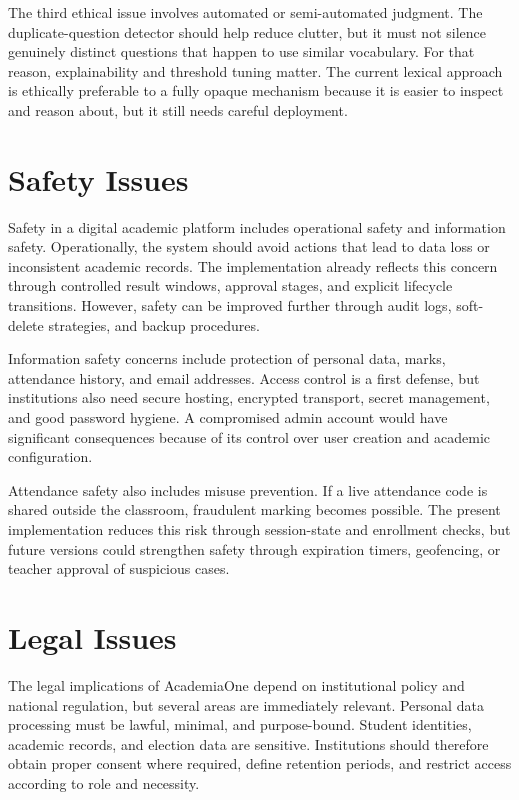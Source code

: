 \documentclass[12pt,a4paper]{report}
\newcommand{\systemName}{AcademiaOne}
\begin{document}
The third ethical issue involves automated or semi-automated judgment. The duplicate-question detector should help reduce clutter, but it must not silence genuinely distinct questions that happen to use similar vocabulary. For that reason, explainability and threshold tuning matter. The current lexical approach is ethically preferable to a fully opaque mechanism because it is easier to inspect and reason about, but it still needs careful deployment.

\section{Safety Issues}
Safety in a digital academic platform includes operational safety and information safety. Operationally, the system should avoid actions that lead to data loss or inconsistent academic records. The implementation already reflects this concern through controlled result windows, approval stages, and explicit lifecycle transitions. However, safety can be improved further through audit logs, soft-delete strategies, and backup procedures.

Information safety concerns include protection of personal data, marks, attendance history, and email addresses. Access control is a first defense, but institutions also need secure hosting, encrypted transport, secret management, and good password hygiene. A compromised admin account would have significant consequences because of its control over user creation and academic configuration.

Attendance safety also includes misuse prevention. If a live attendance code is shared outside the classroom, fraudulent marking becomes possible. The present implementation reduces this risk through session-state and enrollment checks, but future versions could strengthen safety through expiration timers, geofencing, or teacher approval of suspicious cases.

\section{Legal Issues}
The legal implications of \systemName{} depend on institutional policy and national regulation, but several areas are immediately relevant. Personal data processing must be lawful, minimal, and purpose-bound. Student identities, academic records, and election data are sensitive. Institutions should therefore obtain proper consent where required, define retention periods, and restrict access according to role and necessity.
\end{document}
